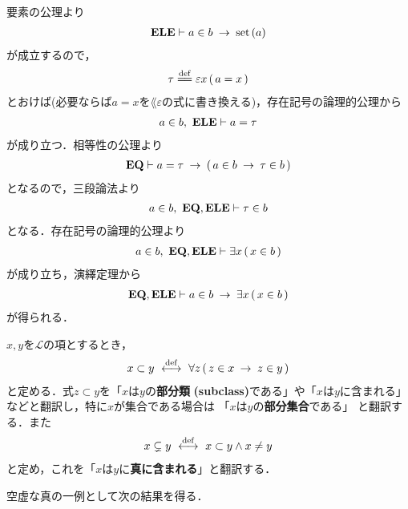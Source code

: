 	\begin{prf}
		要素の公理より
		\begin{align}
			\mbox{{\bf ELE}} \vdash a \in b \hspace{0.25em}\rightarrow\hspace{0.25em} \operatorname*{set}\hspace{0.15em}(a)
		\end{align}
		が成立するので，
		\begin{align}
			\tau \defeq \varepsilon x\, (\, a = x\, )
		\end{align}
		とおけば(必要ならば$a = x$を$\lang{\varepsilon}$の式に書き換える)，存在記号の論理的公理から
		\begin{align}
			a \in b,\ \mbox{{\bf ELE}} \vdash a = \tau
		\end{align}
		が成り立つ．相等性の公理より
		\begin{align}
			\mbox{{\bf EQ}} \vdash a = \tau \hspace{0.25em}\rightarrow\hspace{0.25em} (\, a \in b \hspace{0.25em}\rightarrow\hspace{0.25em} \tau \in b\, )
		\end{align}
		となるので，三段論法より
		\begin{align}
			a \in b,\ \mbox{{\bf EQ}},\mbox{{\bf ELE}} \vdash \tau \in b
		\end{align}
		となる．存在記号の論理的公理より
		\begin{align}
			a \in b,\ \mbox{{\bf EQ}},\mbox{{\bf ELE}} \vdash \exists x\, (\, x \in b\, )
		\end{align}
		が成り立ち，演繹定理から
		\begin{align}
			\mbox{{\bf EQ}},\mbox{{\bf ELE}} \vdash a \in b \hspace{0.25em}\rightarrow\hspace{0.25em} \exists x\, (\, x \in b\, )
		\end{align}
		が得られる．
		\QED
	\end{prf}
	
	\begin{screen}
		\begin{dfn}[部分類]
			$x,y$を$\mathcal{L}$の項とするとき，
			\begin{align}
				x \subset y \ \overset{\mathrm{def}}{\longleftrightarrow}\ 
				\forall z\, (\, z \in x \hspace{0.25em}\rightarrow\hspace{0.25em} z \in y\, )
			\end{align}
			と定める．式$z \subset y$を「$x$は$y$の{\bf 部分類}
			{\bf (subclass)}である」や「$x$は$y$に含まれる」などと翻訳し，特に$x$が集合である場合は
			「$x$は$y$の{\bf 部分集合}である」
			と翻訳する．また
			\begin{align}
				x \subsetneq y \ \overset{\mathrm{def}}{\longleftrightarrow}\  x \subset y \wedge x \neq y
			\end{align}
			と定め，これを「$x$は$y$に{\bf 真に含まれる}」と翻訳する．
		\end{dfn}
	\end{screen}
	
	空虚な真の一例として次の結果を得る．
	
